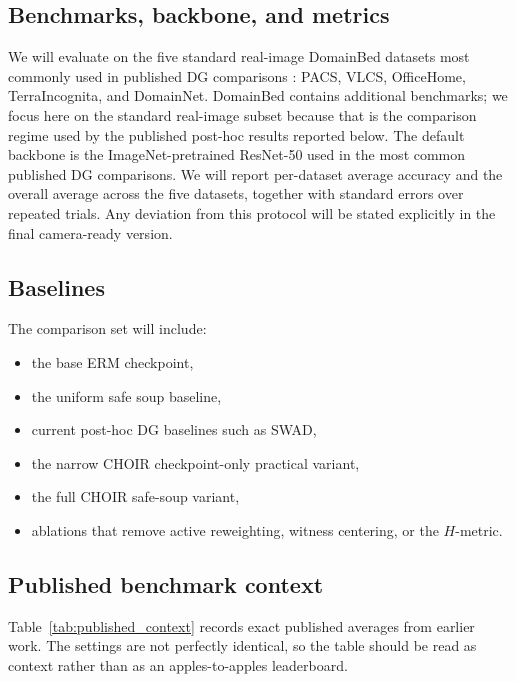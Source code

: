 \documentclass{article}
\newcommand{\choir}{\textup{\textsc{CHOIR}}}
\newcommand{\swad}{\textup{\textsc{SWAD}}}
\newcommand{\erm}{\textup{\textsc{ERM}}}
\begin{document}
\subsection{Benchmarks, backbone, and metrics}

We will evaluate on the five standard real-image DomainBed datasets most commonly used in published DG comparisons \citep{gulrajani2021domainbed}: PACS, VLCS, OfficeHome, TerraIncognita, and DomainNet. DomainBed contains additional benchmarks; we focus here on the standard real-image subset because that is the comparison regime used by the published post-hoc results reported below. The default backbone is the ImageNet-pretrained ResNet-50 used in the most common published DG comparisons. We will report per-dataset average accuracy and the overall average across the five datasets, together with standard errors over repeated trials. Any deviation from this protocol will be stated explicitly in the final camera-ready version.

\subsection{Baselines}

The comparison set will include:
\begin{itemize}[leftmargin=1.4em]
    \item the base \erm{} checkpoint,
    \item the uniform safe soup baseline,
    \item current post-hoc DG baselines such as \swad{},
    \item the narrow \choir{} checkpoint-only practical variant,
    \item the full \choir{} safe-soup variant,
    \item ablations that remove active reweighting, witness centering, or the \(H\)-metric.
\end{itemize}

\subsection{Published benchmark context}

Table~\ref{tab:published_context} records exact published averages from earlier work. The settings are not perfectly identical, so the table should be read as context rather than as an apples-to-apples leaderboard.
\end{document}
